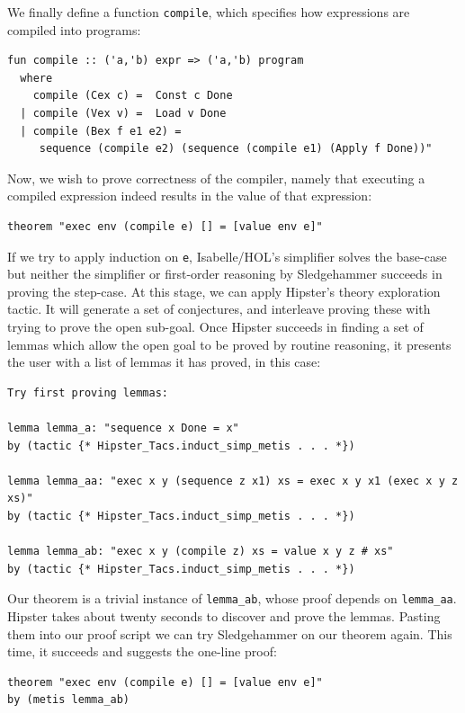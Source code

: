 We finally define a function \texttt{compile}, which specifies how expressions are compiled into programs:
\begin{small}
\begin{verbatim}
fun compile :: ('a,'b) expr => ('a,'b) program
  where
    compile (Cex c) =  Const c Done
  | compile (Vex v) =  Load v Done
  | compile (Bex f e1 e2) =
     sequence (compile e2) (sequence (compile e1) (Apply f Done))"
\end{verbatim}
\end{small}
Now, we wish to prove correctness of the compiler, namely that executing a compiled expression indeed results in the value of that expression: 
\begin{verbatim}
theorem "exec env (compile e) [] = [value env e]"
\end{verbatim}
If we try to apply induction on \texttt{e}, Isabelle/HOL's simplifier solves the base-case but neither the simplifier or first-order reasoning by Sledgehammer succeeds in proving the step-case. At this stage, we can apply Hipster's theory exploration tactic. It will generate a set of conjectures, and interleave proving these with trying to prove the open sub-goal. Once Hipster succeeds in finding a set of lemmas which allow the open goal to be proved by routine reasoning, it presents the user with a list of lemmas it has proved, in this case:
\begin{small}
\begin{verbatim}
Try first proving lemmas:

lemma lemma_a: "sequence x Done = x"
by (tactic {* Hipster_Tacs.induct_simp_metis . . . *})

lemma lemma_aa: "exec x y (sequence z x1) xs = exec x y x1 (exec x y z xs)"
by (tactic {* Hipster_Tacs.induct_simp_metis . . . *})

lemma lemma_ab: "exec x y (compile z) xs = value x y z # xs"
by (tactic {* Hipster_Tacs.induct_simp_metis . . . *})
\end{verbatim}
\end{small}
Our theorem is a trivial instance of \verb|lemma_ab|, whose proof
depends on \verb|lemma_aa|. Hipster takes about twenty seconds to
discover and prove the lemmas.
Pasting them into our proof script we can try Sledgehammer on our theorem again. This time, it succeeds and suggests the one-line proof:%
\begin{verbatim}
theorem "exec env (compile e) [] = [value env e]"
by (metis lemma_ab)
\end{verbatim}
